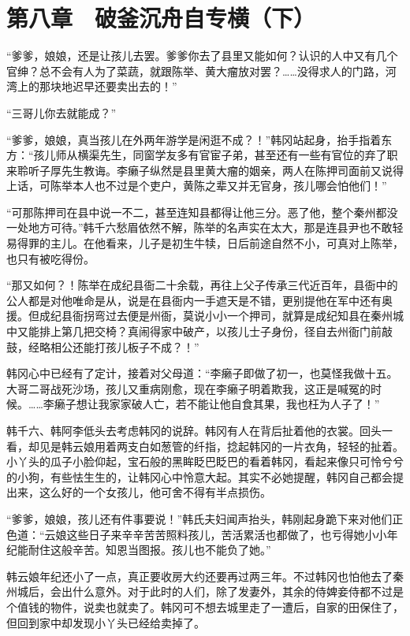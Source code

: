 \section{第八章　破釜沉舟自专横（下）}

“爹爹，娘娘，还是让孩儿去罢。爹爹你去了县里又能如何？认识的人中又有几个官绅？总不会有人为了菜蔬，就跟陈举、黄大瘤放对罢？……没得求人的门路，河湾上的那块地迟早还要卖出去的！”

“三哥儿你去就能成？”

“爹爹，娘娘，真当孩儿在外两年游学是闲逛不成？！”韩冈站起身，抬手指着东方：“孩儿师从横渠先生，同窗学友多有官宦子弟，甚至还有一些有官位的弃了职来聆听子厚先生教诲。李癞子纵然是县里黄大瘤的姻亲，两人在陈押司面前又说得上话，可陈举本人也不过是个吏户，黄陈之辈又并无官身，孩儿哪会怕他们！”

“可那陈押司在县中说一不二，甚至连知县都得让他三分。恶了他，整个秦州都没一处地方可待。”韩千六愁眉依然不解，陈举的名声实在太大，那是连县尹也不敢轻易得罪的主儿。在他看来，儿子是初生牛犊，日后前途自然不小，可真对上陈举，也只有被吃得份。

“那又如何？！陈举在成纪县衙二十余载，再往上父子传承三代近百年，县衙中的公人都是对他唯命是从，说是在县衙内一手遮天是不错，更别提他在军中还有奥援。但成纪县衙拐弯过去便是州衙，莫说小小一个押司，就算是成纪知县在秦州城中又能排上第几把交椅？真闹得家中破产，以孩儿士子身份，径自去州衙门前敲鼓，经略相公还能打孩儿板子不成？！”

韩冈心中已经有了定计，接着对父母道：“李癞子即做了初一，也莫怪我做十五。大哥二哥战死沙场，孩儿又重病刚愈，现在李癞子明着欺我，这正是喊冤的时候。……李癞子想让我家家破人亡，若不能让他自食其果，我也枉为人子了！”

韩千六、韩阿李低头去考虑韩冈的说辞。韩冈有人在背后扯着他的衣裳。回头一看，却见是韩云娘用着两支白如葱管的纤指，捻起韩冈的一片衣角，轻轻的扯着。小丫头的瓜子小脸仰起，宝石般的黑眸眨巴眨巴的看着韩冈，看起来像只可怜兮兮的小狗，有些怯生生的，让韩冈心中怜意大起。其实不必她提醒，韩冈自己都会提出来，这么好的一个女孩儿，他可舍不得有半点损伤。

“爹爹，娘娘，孩儿还有件事要说！”韩氏夫妇闻声抬头，韩刚起身跪下来对他们正色道：“云娘这些日子来辛辛苦苦照料孩儿，苦活累活也都做了，也亏得她小小年纪能耐住这般辛苦。知恩当图报。孩儿也不能负了她。”

韩云娘年纪还小了一点，真正要收房大约还要再过两三年。不过韩冈也怕他去了秦州城后，会出什么意外。对于此时的人们，除了发妻外，其余的侍婢妾侍都不过是个值钱的物件，说卖也就卖了。韩冈可不想去城里走了一遭后，自家的田保住了，但回到家中却发现小丫头已经给卖掉了。

